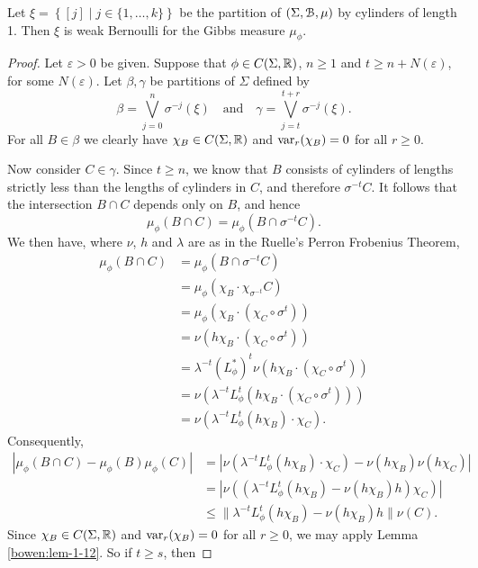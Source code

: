 \begin{theorem}\label{thm:gibbs-is-weak-bernoulli}
	Let $\xi = \left\{[j] \mid j \in \{1, \dots, k\}\right\}$ be the partition of $(\Sigma, \mathcal{B}, \mu)$ by cylinders of length 1. Then $\xi$ is weak Bernoulli for the Gibbs measure $\mu_\phi$.
	\begin{proof}
		Let $\varepsilon > 0$ be given. Suppose that $\phi \in C(\Sigma, \mathbb{R})$, $n \geq 1$ and $t \geq n + N(\varepsilon)$, for some $N(\varepsilon)$. Let $\beta, \gamma$ be partitions of $\Sigma$ defined by
		\[
		\beta = \bigvee_{j = 0}^n{\sigma^{-j}(\xi)} \quad \text{and} \quad \gamma = \bigvee_{j = t}^{t + r}{\sigma^{-j}(\xi)}.
		\]
		For all $B \in \beta$ we clearly have $\chi_B \in C(\Sigma, \mathbb{R})$ and $\operatorname{var}_r(\chi_B) = 0$ for all $r \geq 0$.
		
		Now consider $C \in \gamma$. Since $t \geq n$, we know that $B$ consists of cylinders of lengths strictly less than the lengths of cylinders in $C$, and therefore $\sigma^{-t}C$. It follows that the intersection $B \cap C$ depends only on $B$, and hence
		\[
			\mu_\phi(B \cap C) = \mu_\phi(B \cap \sigma^{-t}{C}).
		\]
		We then have, where $\nu$, $h$ and $\lambda$ are as in the Ruelle's Perron Frobenius Theorem,
		\begin{align*}
			\mu_\phi(B \cap C) &= \mu_\phi(B \cap \sigma^{-t}C) \\
				&= \mu_\phi(\chi_B \cdot \chi_{\sigma^{-t}}{C}) \\
				&= \mu_\phi(\chi_B \cdot (\chi_{C} \circ \sigma^t)) \\
				&= \nu(h \chi_B \cdot (\chi_C \circ \sigma^t)) \\
				&= \lambda^{-t}(L_\phi^*)^t\nu(h\chi_B \cdot (\chi_C \circ \sigma^t)) \\
				&= \nu(\lambda^{-t} L_\phi^t(h \chi_B \cdot (\chi_C \circ \sigma^t))) \\
				&= \nu(\lambda^{-t} L_\phi^t(h \chi_B) \cdot \chi_C).
		\end{align*}
		Consequently,
		\begin{align*}
			|\mu_\phi(B \cap C) - \mu_\phi(B)\mu_\phi(C)| &= |\nu(\lambda^{-t} L_\phi^t(h \chi_B) \cdot \chi_C) - \nu(h \chi_B)\nu(h \chi_C)| \\
				&= |\nu((\lambda^{-t} L_\phi^t(h \chi_B) - \nu(h \chi_B)h)\chi_C)| \\
				&\leq \|\lambda^{-t} L_\phi^t(h \chi_B) - \nu(h \chi_B)h\| \nu(C).
		\end{align*}
		Since $\chi_B \in C(\Sigma, \mathbb{R})$ and $\operatorname{var}_r(\chi_B) = 0$ for all $r \geq 0$, we may apply Lemma \ref{bowen:lem-1-12}. So if $t \geq s$, then

\end{proof}
\end{theorem}
